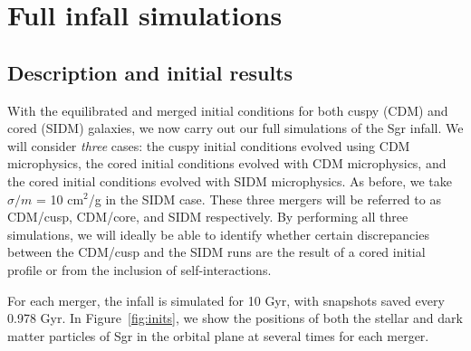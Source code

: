 \hypertarget{full-infall-simulations}{%
\chapter{Full infall simulations}\label{full-infall-simulations}}

\hypertarget{description-and-initial-results}{%
\section{Description and initial
results}\label{description-and-initial-results}}

With the equilibrated and merged initial conditions for both cuspy (CDM) and
cored (SIDM) galaxies, we now carry out our full simulations of the Sgr
infall.  We will consider \emph{three} cases: the cuspy initial conditions
evolved using CDM microphysics, the cored initial conditions evolved with CDM
microphysics, and the cored initial conditions evolved with SIDM microphysics.
As before, we take \(\sigma / m\) = 10 cm\(^2\)/g in the SIDM case.  These
three mergers will be referred to as CDM/cusp, CDM/core, and SIDM
respectively.  By performing all three simulations, we will ideally be able to
identify whether certain discrepancies between the CDM/cusp and the SIDM runs
are the result of a cored initial profile or from the inclusion of
self-interactions.

For each merger, the infall is simulated for 10 Gyr, with snapshots saved
every 0.978 Gyr.  In Figure~\ref{fig:inits}, we show the positions of both the
stellar and dark matter particles of Sgr in the orbital plane at several times
for each merger.

